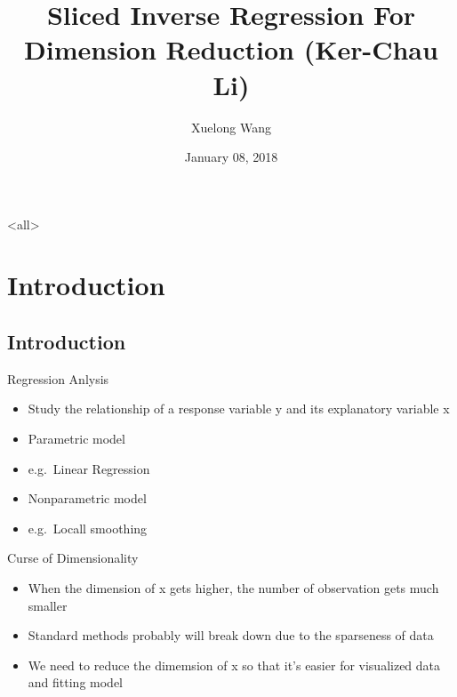 \documentclass[ignorenonframetext,]{beamer}
\author[
Xuelong Wang
]{Xuelong Wang}
\date[
01/08/2018
]{
January 08, 2018
}
\providecommand{\tightlist}{%
  \setlength{\itemsep}{0pt}\setlength{\parskip}{0pt}}
\begin{document}
\mode<all>{
\title[
SIR
]{
Sliced Inverse Regression For Dimension Reduction (Ker-Chau Li)
}
}
\mode*

\frame{\titlepage}

\begin{frame}
\tableofcontents[hideallsubsections]
\end{frame}

\section{Introduction}\label{introduction}

\subsection{Introduction}\label{introduction-1}

\begin{frame}{Regression Anlysis}

\begin{itemize}
\tightlist
\item
  Study the relationship of a response variable y and its explanatory
  variable x
\item
  Parametric model\\
\item
  e.g.~Linear Regression\\
\item
  Nonparametric model\\
\item
  e.g.~Locall smoothing
\end{itemize}

\end{frame}

\begin{frame}{Curse of Dimensionality}

\begin{itemize}
\tightlist
\item
  When the dimension of x gets higher, the number of observation gets
  much smaller
\item
  Standard methods probably will break down due to the sparseness of
  data
\item
  We need to reduce the dimemsion of x so that it's easier for
  visualized data and fitting model
\end{itemize}

\end{frame}
\end{document}
